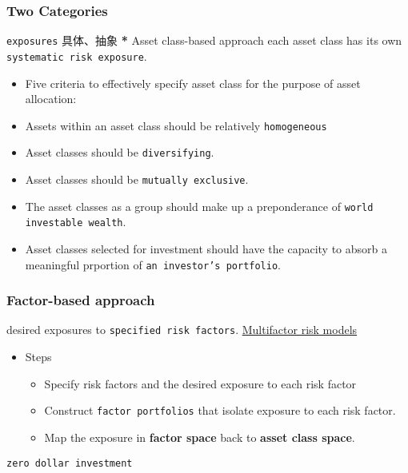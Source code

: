 \documentclass[12pt,a4paper]{article}
\begin{document}
\subsubsection{Two Categories}
\label{sec:orge5a4c8a}
\texttt{exposures} 具体、抽象
\textbf{*} Asset class-based approach
each asset class has its own \texttt{systematic risk exposure}.
\begin{itemize}
\item Five criteria to effectively specify asset class for the purpose of asset allocation:
\item Assets within an asset class should be relatively \texttt{homogeneous}
\item Asset classes should be \texttt{diversifying}.
\item Asset classes should be \texttt{mutually exclusive}.
\item The asset classes as a group should make up a preponderance of \texttt{world investable wealth}.
\item Asset classes selected for investment should have the capacity to absorb a meaningful prportion of \texttt{an investor's portfolio}.
\end{itemize}
\subsubsection{Factor-based approach}
\label{sec:orgcf5d4fa}
desired exposures to \texttt{specified risk factors}.
\uline{Multifactor risk models}
\begin{itemize}
\item Steps
\begin{itemize}
\item Specify risk factors and the desired exposure to each risk factor
\item Construct \texttt{factor portfolios} that isolate exposure to each risk factor.
\item Map the exposure in \textbf{factor space} back to \textbf{asset class space}.
\end{itemize}
\end{itemize}
\texttt{zero dollar investment}
\end{document}
